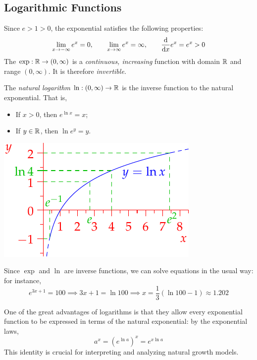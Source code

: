 \clearpage



\subsection{Logarithmic Functions}

Since $e>1>0$, the exponential satisfies the following properties:
\[
	\lim_{x\to -\infty}e^x=0,\qquad \lim_{x\to\infty}e^x=\infty,\qquad \frac{\mathrm{d} }{\mathrm{d} x}e^x=e^x>0
\]
The $\exp:\mathbb{R}\to(0,\infty)$ is a \emph{continuous, increasing} function with domain $\mathbb{R}$ and range $(0,\infty)$. It is therefore \emph{invertible.}


\begin{defn}[lower separated=false, sidebyside, sidebyside align=top seam, sidebyside gap=0pt, righthand width=0.4\linewidth]{}{}
	The \emph{natural logarithm} $\ln:(0,\infty)\to\mathbb{R}$ is the inverse function to the natural exponential. That is,
	\begin{itemize}
		\item If $x>0$, then $e^{\ln x}=x$;
		\item If $y\in\mathbb{R}$, then $\ln e^y=y$.
	\end{itemize}
	\tcblower
	\flushright\includegraphics{log}
\end{defn}

Since $\exp$ and $\ln$ are inverse functions, we can solve equations in the usual way: for instance,
\[
	e^{3x+1}=100 \implies 3x+1=\ln 100\implies x=\frac 13(\ln 100-1) \approx 1.202
\]



One of the great advantages of logarithms is that they allow every exponential function to be expressed in terms of the natural exponential: by the exponential laws,
\[
	a^x=(e^{\ln a})^x=e^{x\ln a}
\]
This identity is crucial for interpreting and analyzing natural growth models.


